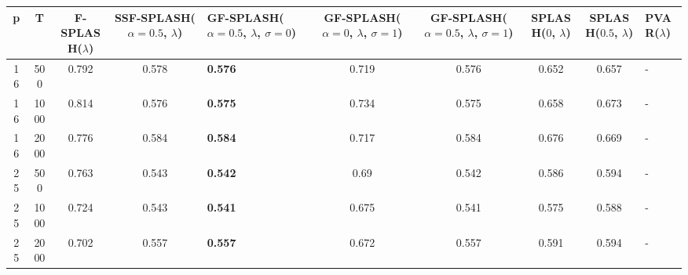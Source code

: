 \begin{tabular}{cccclccccl}
\hline
  p  &  T   &  F-SPLASH($\lambda$)  &  SSF-SPLASH($\alpha=0.5$, $\lambda$)  & GF-SPLASH($\alpha=0.5$, $\lambda$, $\sigma=0$)   &  GF-SPLASH($\alpha=0$, $\lambda$, $\sigma=1$)  &  GF-SPLASH($\alpha=0.5$, $\lambda$, $\sigma=1$)  &  SPLASH($0$, $\lambda$)  &  SPLASH($0.5$, $\lambda$)  & PVAR($\lambda$)   \\
\hline
 16  & 500  &         0.792         &                 0.578                 & \textbf{0.576}                                   &                     0.719                      &                      0.576                       &          0.652           &           0.657            & -                 \\
 16  & 1000 &         0.814         &                 0.576                 & \textbf{0.575}                                   &                     0.734                      &                      0.575                       &          0.658           &           0.673            & -                 \\
 16  & 2000 &         0.776         &                 0.584                 & \textbf{0.584}                                   &                     0.717                      &                      0.584                       &          0.676           &           0.669            & -                 \\
 25  & 500  &         0.763         &                 0.543                 & \textbf{0.542}                                   &                      0.69                      &                      0.542                       &          0.586           &           0.594            & -                 \\
 25  & 1000 &         0.724         &                 0.543                 & \textbf{0.541}                                   &                     0.675                      &                      0.541                       &          0.575           &           0.588            & -                 \\
 25  & 2000 &         0.702         &                 0.557                 & \textbf{0.557}                                   &                     0.672                      &                      0.557                       &          0.591           &           0.594            & -                 \\
\hline
\end{tabular}